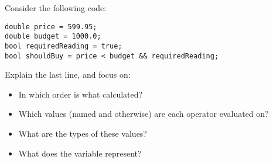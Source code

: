 Consider the following code:

\begin{verbatim}
double price = 599.95;
double budget = 1000.0;
bool requiredReading = true;
bool shouldBuy = price < budget && requiredReading;
\end{verbatim}

Explain the last line, and focus on:
\begin{itemize}
  \item In which order is what calculated?
  \item Which values (named and otherwise) are each operator evaluated on?
  \item What are the types of these values?
  \item What does the variable  represent?
\end{itemize}
